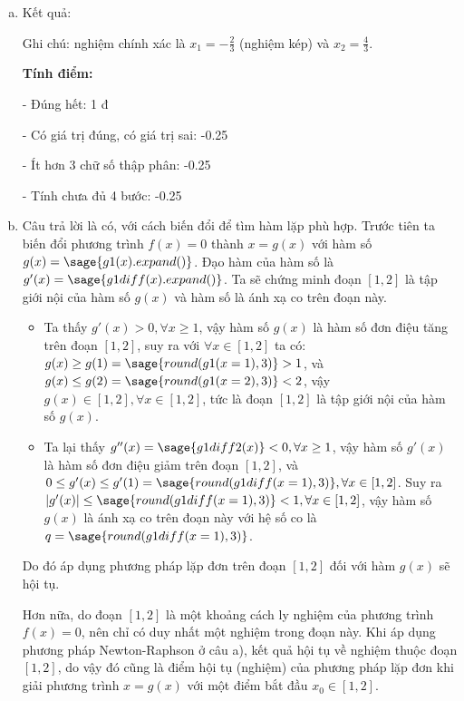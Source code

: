 \documentclass[12pt]{article}
\begin{document}
\begin{enumerate}[a).]
\item Kết quả:

\begin{center}  \end{center}

Ghi chú: nghiệm chính xác là $x_1=-\frac{2}{3}$ (nghiệm kép) và $x_2=\frac{4}{3}$.

\textbf{Tính điểm:} 

- Đúng hết: 1 đ

- Có giá trị đúng, có giá trị sai: -0.25

- Ít hơn 3 chữ số thập phân: -0.25

- Tính chưa đủ 4 bước: -0.25

\item Câu trả lời là có, với cách biến đổi để tìm hàm lặp phù hợp. Trước tiên ta biến đổi phương trình $f(x)=0$ thành $x=g(x)$ với hàm số $g(x)=\sage{g1(x).expand()}$. Đạo hàm của hàm số là $g'(x)=\sage{g1diff(x).expand()}$. Ta sẽ chứng minh đoạn $[1,2]$ là tập giới nội của hàm số $g(x)$ và hàm số là ánh xạ co trên đoạn này.

\begin{itemize}
 \item Ta thấy $g'(x) > 0, \forall x \geq 1$, vậy hàm số $g(x)$ là hàm số đơn điệu tăng trên đoạn $[1,2]$, suy ra với $\forall x \in [1,2]$ ta có: $g(x) \geq g(1) = \sage{round(g1(x=1),3)} > 1$, và $ g(x) \leq g(2) = \sage{round(g1(x=2),3)} < 2$, vậy $g(x) \in [1,2], \forall x \in [1,2]$, tức là đoạn $[1,2]$ là tập giới nội của hàm số $g(x)$.
 
 \item Ta lại thấy $g''(x)=\sage{g1diff2(x)}<0, \forall x \geq 1$, vậy hàm số $g'(x)$ là hàm số đơn điệu giảm trên đoạn $[1,2]$, và $0 \leq g'(x) \leq g'(1) = \sage{round(g1diff(x=1),3)}, \forall x \in [1,2]$. Suy ra  $|g'(x)| \leq \sage{round(g1diff(x=1),3)} < 1, \forall x \in [1,2]$, vậy hàm số $g(x)$ là ánh xạ co trên đoạn này với hệ số co là $q = \sage{round(g1diff(x=1),3)}$.
\end{itemize} 
Do đó áp dụng phương pháp lặp đơn trên đoạn $[1,2]$ đối với hàm $g(x)$ sẽ hội tụ.

Hơn nữa, do đoạn $[1,2]$ là một khoảng cách ly nghiệm của phương trình $f(x)=0$, nên chỉ có duy nhất một nghiệm trong đoạn này. Khi áp dụng phương pháp Newton-Raphson ở câu a), kết quả hội tụ về nghiệm thuộc đoạn $[1,2]$, do vậy đó cũng là điểm hội tụ (nghiệm) của phương pháp lặp đơn khi giải phương trình $x=g(x)$ với một điểm bắt đầu $x_0 \in [1,2]$. 
\end{enumerate}
\end{document}

